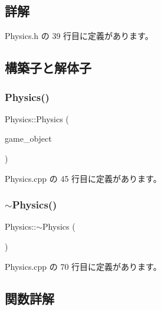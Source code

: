 \subsection{詳解}


 Physics.\+h の 39 行目に定義があります。



\subsection{構築子と解体子}
\mbox{\label{class_physics_a2e4cab77c53c0acf5273bd4986f8423d}} 
\subsubsection{\texorpdfstring{Physics()}{Physics()}}
{\footnotesize\ttfamily Physics\+::\+Physics (\begin{DoxyParamCaption}\item[{\mbox{\hyperlink{class_game_object_base}{Game\+Object\+Base}} $\ast$}]{game\+\_\+object }\end{DoxyParamCaption})}



 Physics.\+cpp の 45 行目に定義があります。

\mbox{\label{class_physics_a045c3788e28059d3920136499942490f}} 
\subsubsection{\texorpdfstring{$\sim$\+Physics()}{~Physics()}}
{\footnotesize\ttfamily Physics\+::$\sim$\+Physics (\begin{DoxyParamCaption}{ }\end{DoxyParamCaption})}



 Physics.\+cpp の 70 行目に定義があります。



\subsection{関数詳解}
\mbox{\label{class_physics_af88191e5605a97952caefd19319b05f9}} 
